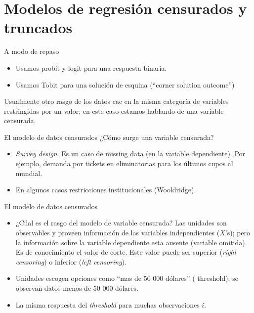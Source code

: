 \section[Censurado y truncado]{Modelos de regresión censurados y truncados}


\begin{frame}{A modo de repaso}
	\begin{itemize}
		\item Usamos probit y logit para una respuesta binaria.
		\item Usamos Tobit para una solución de esquina (``corner solution outcome'')   
	\end{itemize}
	Usualmente otro rasgo de los datos cae en la misma categor\'{i}a de variables restringidas por un valor; en este caso estamos hablando de una variable censurada.
\end{frame}
\begin{frame}{El modelo de datos censurados}
	¿Cómo surge una variable censurada?
		\begin{itemize}
			\item \textit{Survey design}. Es un caso de missing data (en la variable dependiente). Por ejemplo, demanda por tickets en eliminatorias para los últimos cupos al mundial.
			\item En algunos casos restricciones institucionales (Wooldridge).	   
		\end{itemize}
\end{frame}
\begin{frame}{El modelo de datos censurados}
	\begin{itemize}
		\item ¿Cúal es el rasgo del modelo de variable censurada? Las unidades son observables y proveen información de las variables independientes ($X$'s); pero la información sobre la variable dependiente esta ausente (variable omitida). Es de conocimiento el valor de corte. Este valor puede ser superior (\textit{right censoring}) o inferior (\textit{left censoring}).
		\item Unidades escogen opciones como ``mas de 50 000 dólares'' ( threshold); se observan datos menos de 50 000 dólares.
		\item La misma respuesta del \textit{threshold} para muchas observaciones $i$.
	\end{itemize}
\end{frame}
